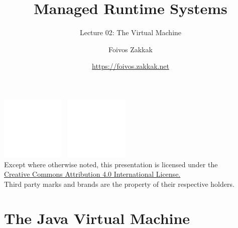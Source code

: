 \documentclass[
14pt,
aspectratio=169,
usenames,
dvipsnames,
x11names]{beamer}
\title{Managed Runtime Systems}
\subtitle{Lecture 02: The \java Virtual Machine}
\author[\url{https://foivos.zakkak.net}]{Foivos Zakkak}
\date{\url{https://foivos.zakkak.net}}
\begin{document}


\begin{frame}[plain]
  \titlepage
  \centering
  \includegraphics[height=.75cm]{cc}~
  \includegraphics[height=.75cm]{by}\\[1em]
  \scriptsize{Except where otherwise noted, this presentation is licensed under the\\
    \href{http://creativecommons.org/licenses/by/4.0/}%
    {Creative Commons Attribution 4.0 International License.}\\[1ex]
    Third party marks and brands are the property of their respective
    holders.}
\end{frame}


\section{The Java Virtual Machine}
\end{document}
